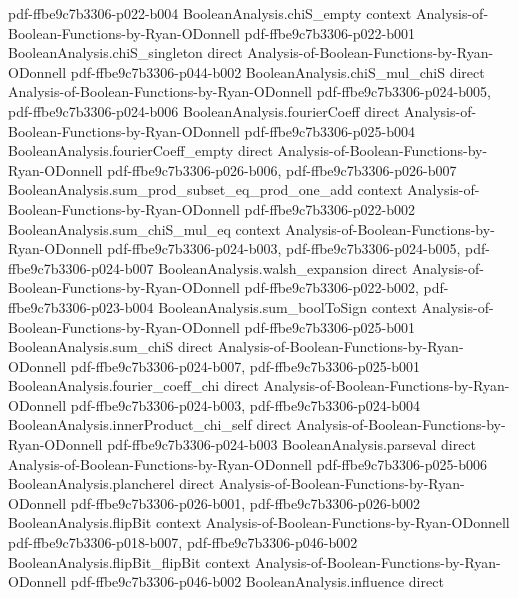 \begin{theorem}
  {pdf-ffbe9c7b3306-p022-b004}
\proofstep
  {BooleanAnalysis.chiS_empty}
  {context}
  {Analysis-of-Boolean-Functions-by-Ryan-ODonnell}
  {pdf-ffbe9c7b3306-p022-b001}
\proofstep
  {BooleanAnalysis.chiS_singleton}
  {direct}
  {Analysis-of-Boolean-Functions-by-Ryan-ODonnell}
  {pdf-ffbe9c7b3306-p044-b002}
\proofstep
  {BooleanAnalysis.chiS_mul_chiS}
  {direct}
  {Analysis-of-Boolean-Functions-by-Ryan-ODonnell}
  {pdf-ffbe9c7b3306-p024-b005,
    pdf-ffbe9c7b3306-p024-b006}
\proofstep
  {BooleanAnalysis.fourierCoeff}
  {direct}
  {Analysis-of-Boolean-Functions-by-Ryan-ODonnell}
  {pdf-ffbe9c7b3306-p025-b004}
\proofstep
  {BooleanAnalysis.fourierCoeff_empty}
  {direct}
  {Analysis-of-Boolean-Functions-by-Ryan-ODonnell}
  {pdf-ffbe9c7b3306-p026-b006,
    pdf-ffbe9c7b3306-p026-b007}
\proofstep
  {BooleanAnalysis.sum_prod_subset_eq_prod_one_add}
  {context}
  {Analysis-of-Boolean-Functions-by-Ryan-ODonnell}
  {pdf-ffbe9c7b3306-p022-b002}
\proofstep
  {BooleanAnalysis.sum_chiS_mul_eq}
  {context}
  {Analysis-of-Boolean-Functions-by-Ryan-ODonnell}
  {pdf-ffbe9c7b3306-p024-b003,
    pdf-ffbe9c7b3306-p024-b005,
    pdf-ffbe9c7b3306-p024-b007}
\proofstep
  {BooleanAnalysis.walsh_expansion}
  {direct}
  {Analysis-of-Boolean-Functions-by-Ryan-ODonnell}
  {pdf-ffbe9c7b3306-p022-b002,
    pdf-ffbe9c7b3306-p023-b004}
\proofstep
  {BooleanAnalysis.sum_boolToSign}
  {context}
  {Analysis-of-Boolean-Functions-by-Ryan-ODonnell}
  {pdf-ffbe9c7b3306-p025-b001}
\proofstep
  {BooleanAnalysis.sum_chiS}
  {direct}
  {Analysis-of-Boolean-Functions-by-Ryan-ODonnell}
  {pdf-ffbe9c7b3306-p024-b007,
    pdf-ffbe9c7b3306-p025-b001}
\proofstep
  {BooleanAnalysis.fourier_coeff_chi}
  {direct}
  {Analysis-of-Boolean-Functions-by-Ryan-ODonnell}
  {pdf-ffbe9c7b3306-p024-b003,
    pdf-ffbe9c7b3306-p024-b004}
\proofstep
  {BooleanAnalysis.innerProduct_chi_self}
  {direct}
  {Analysis-of-Boolean-Functions-by-Ryan-ODonnell}
  {pdf-ffbe9c7b3306-p024-b003}
\proofstep
  {BooleanAnalysis.parseval}
  {direct}
  {Analysis-of-Boolean-Functions-by-Ryan-ODonnell}
  {pdf-ffbe9c7b3306-p025-b006}
\proofstep
  {BooleanAnalysis.plancherel}
  {direct}
  {Analysis-of-Boolean-Functions-by-Ryan-ODonnell}
  {pdf-ffbe9c7b3306-p026-b001,
    pdf-ffbe9c7b3306-p026-b002}
\proofstep
  {BooleanAnalysis.flipBit}
  {context}
  {Analysis-of-Boolean-Functions-by-Ryan-ODonnell}
  {pdf-ffbe9c7b3306-p018-b007,
    pdf-ffbe9c7b3306-p046-b002}
\proofstep
  {BooleanAnalysis.flipBit_flipBit}
  {context}
  {Analysis-of-Boolean-Functions-by-Ryan-ODonnell}
  {pdf-ffbe9c7b3306-p046-b002}
\proofstep
  {BooleanAnalysis.influence}
  {direct}

\end{theorem}
